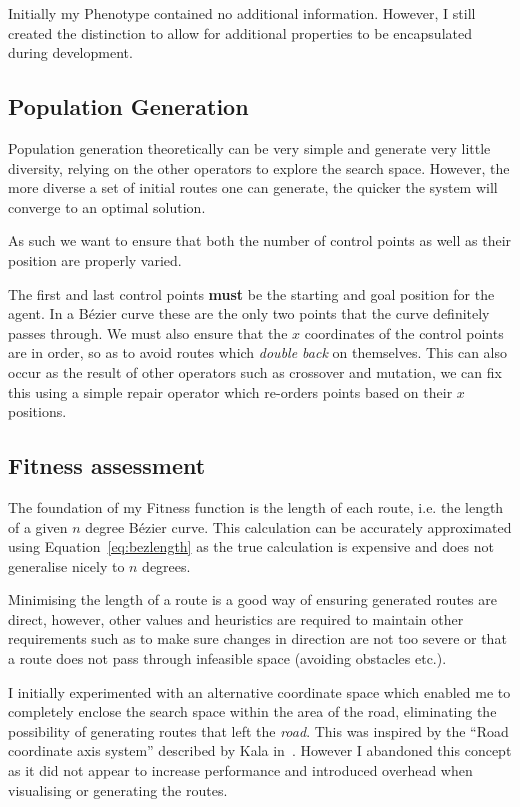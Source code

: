 Initially my Phenotype contained no additional information. However, I still created the distinction to allow for additional properties to be encapsulated during development.

\subsection{Population Generation}

Population generation theoretically can be very simple and generate very little diversity, relying on the other operators to explore the search space. However, the more diverse a set of initial routes one can generate, the quicker the system will converge to an optimal solution.

As such we want to ensure that both the number of control points as well as their position are properly varied.

The first and last control points \textbf{must} be the starting and goal position for the agent. In a Bézier curve these are the only two points that the curve definitely passes through. We must also ensure that the $x$ coordinates of the control points are in order, so as to avoid routes which \textit{double back} on themselves. This can also occur as the result of other operators such as crossover and mutation, we can fix this using a simple repair operator which re-orders points based on their $x$ positions.


\subsection{Fitness assessment}

The foundation of my Fitness function is the length of each route, i.e. the length of a given $n$ degree Bézier curve. This calculation can be accurately approximated using Equation~\ref{eq:bezlength} as the true calculation is expensive and does not generalise nicely to $n$ degrees\cite{gravesenAdaptiveSubdivisionLength1997}.

Minimising the length of a route is a good way of ensuring generated routes are direct, however, other values and heuristics are required to maintain other requirements such as to make sure changes in direction are not too severe or that a route does not pass through infeasible space (avoiding obstacles etc.).

I initially experimented with an alternative coordinate space which enabled me to completely enclose the search space within the area of the road, eliminating the possibility of generating routes that left the \textit{road}. This was inspired by the ``Road coordinate axis system'' described by Kala in~\cite{kalaOptimizationBasedPlanning2016}. However I abandoned this concept as it did not appear to increase performance and introduced overhead when visualising or generating the routes.


